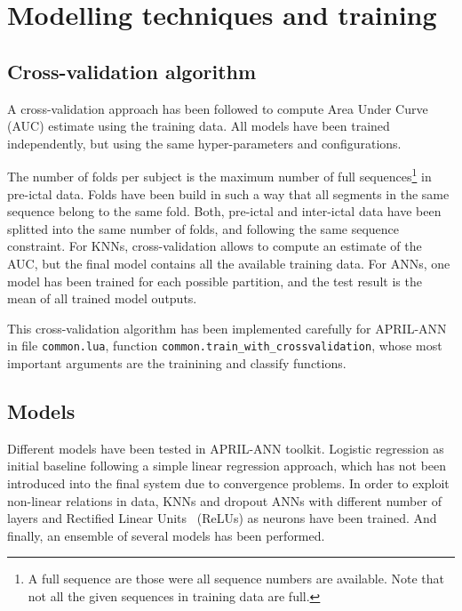 \documentclass[a4paper,english,twoside]{article}
\begin{document}
\section{Modelling techniques and
  training}\label{modelling-techniques-and-training}

\subsection{Cross-validation
  algorithm}\label{cross-validation-algorithm}

A cross-validation approach has been followed to compute Area Under Curve (AUC)
estimate using the training data. All models have been trained independently, but
using the same hyper-parameters and configurations.

The number of folds per subject is the maximum number of full
sequences\footnote{A full sequence are those were all sequence numbers are
  available. Note that not all the given sequences in training data are full.}
in pre-ictal data. Folds have been build in such a way that all segments in the
same sequence belong to the same fold. Both, pre-ictal and inter-ictal data have
been splitted into the same number of folds, and following the same sequence
constraint.  For KNNs, cross-validation allows to compute an estimate of the
AUC, but the final model contains all the available training data.  For ANNs,
one model has been trained for each possible partition, and the test result is
the mean of all trained model outputs.

This cross-validation algorithm has been implemented carefully for APRIL-ANN in
file \verb+common.lua+, function \verb+common.train_with_crossvalidation+,
whose most important arguments are the trainining and classify functions.

\subsection{Models}\label{models}

Different models have been tested in APRIL-ANN toolkit. Logistic regression as
initial baseline following a simple linear regression approach, which has not
been introduced into the final system due to convergence problems.  In order to
exploit non-linear relations in data, KNNs and dropout ANNs with different
number of layers and Rectified Linear Units~\cite{2011:glorot:aistats} (ReLUs)
as neurons have been trained. And finally, an ensemble of several models has
been performed.
\end{document}
